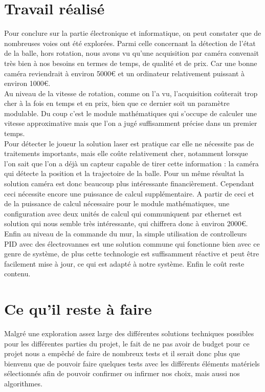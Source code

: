 \section*{Travail réalisé}
Pour conclure sur la partie électronique et informatique, on peut constater que de nombreuses voies ont été explorées. Parmi celle concernant la détection de l'état de la balle, hors rotation, nous avons vu qu'une acquisition par caméra convenait très bien à nos besoins en termes de temps, de qualité et de prix. Car une bonne caméra reviendrait à environ 5000€ et un ordinateur relativement puissant à environ 1000€.\\

Au niveau de la vitesse de rotation, comme on l'a vu, l'acquisition coûterait trop cher à la fois en temps et en prix, bien que ce dernier soit un paramètre modulable. Du coup c'est le module mathématiques qui s'occupe de calculer une vitesse approximative mais que l'on a jugé suffisamment précise dans un premier temps.\\

Pour détecter le joueur la solution laser est pratique car elle ne nécessite pas de traitements importants, mais elle coûte relativement cher, notamment lorsque l'on sait que l'on a déjà un capteur capable de tirer cette information : la caméra qui détecte la position et la trajectoire de la balle. Pour un même résultat la solution caméra est donc beaucoup plus intéressante financièrement. Cependant ceci nécessite encore une puissance de calcul supplémentaire. A partir de ceci et de la puissance de calcul nécessaire pour le module mathématiques, une configuration avec deux unités de calcul qui communiquent par ethernet est solution qui nous semble très intéressante, qui chiffrera donc à environ 2000€.\\

Enfin au niveau de la commande du mur, la simple utilisation de controlleurs PID avec des électrovannes est une solution commune qui fonctionne bien avec ce genre de système, de plus cette technologie est suffisamment réactive et peut être facilement mise à jour, ce qui est adapté à notre système. Enfin le coût reste contenu.\\

\section*{Ce qu'il reste à faire}

Malgré une exploration assez large des différentes solutions techniques possibles pour les différentes parties du projet, le fait de ne pas avoir de budget pour ce projet nous a empêché de faire de nombreux tests et il serait donc plus que bienvenu que de pouvoir faire quelques tests avec les différents éléments matériels sélectionnés afin de pouvoir confirmer ou infirmer nos choix, mais aussi nos algorithmes. \\

